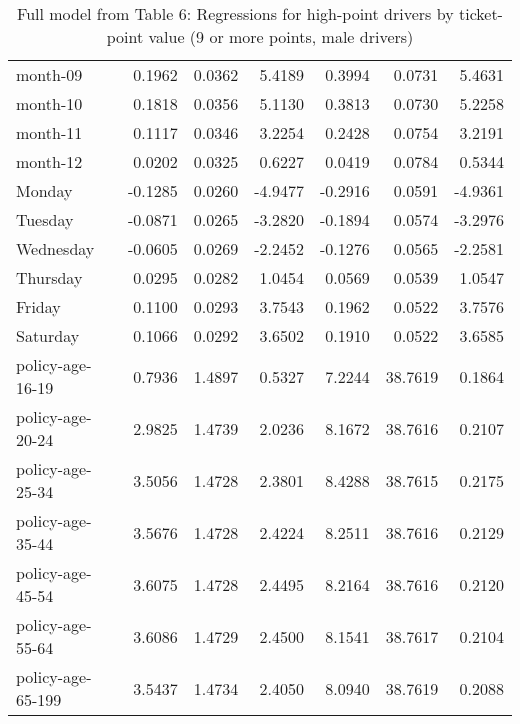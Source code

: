 \documentclass[10pt]{article}
\begin{document}
\begin{table}[ht]
\begin{tabular}{lrrrrrr}
  month-09 & 0.1962 & 0.0362 & 5.4189 & 0.3994 & 0.0731 & 5.4631 \\ 
  month-10 & 0.1818 & 0.0356 & 5.1130 & 0.3813 & 0.0730 & 5.2258 \\ 
  month-11 & 0.1117 & 0.0346 & 3.2254 & 0.2428 & 0.0754 & 3.2191 \\ 
  month-12 & 0.0202 & 0.0325 & 0.6227 & 0.0419 & 0.0784 & 0.5344 \\ 
  Monday & -0.1285 & 0.0260 & -4.9477 & -0.2916 & 0.0591 & -4.9361 \\ 
  Tuesday & -0.0871 & 0.0265 & -3.2820 & -0.1894 & 0.0574 & -3.2976 \\ 
  Wednesday & -0.0605 & 0.0269 & -2.2452 & -0.1276 & 0.0565 & -2.2581 \\ 
  Thursday & 0.0295 & 0.0282 & 1.0454 & 0.0569 & 0.0539 & 1.0547 \\ 
  Friday & 0.1100 & 0.0293 & 3.7543 & 0.1962 & 0.0522 & 3.7576 \\ 
  Saturday & 0.1066 & 0.0292 & 3.6502 & 0.1910 & 0.0522 & 3.6585 \\ 
  policy-age-16-19 & 0.7936 & 1.4897 & 0.5327 & 7.2244 & 38.7619 & 0.1864 \\ 
  policy-age-20-24 & 2.9825 & 1.4739 & 2.0236 & 8.1672 & 38.7616 & 0.2107 \\ 
  policy-age-25-34 & 3.5056 & 1.4728 & 2.3801 & 8.4288 & 38.7615 & 0.2175 \\ 
  policy-age-35-44 & 3.5676 & 1.4728 & 2.4224 & 8.2511 & 38.7616 & 0.2129 \\ 
  policy-age-45-54 & 3.6075 & 1.4728 & 2.4495 & 8.2164 & 38.7616 & 0.2120 \\ 
  policy-age-55-64 & 3.6086 & 1.4729 & 2.4500 & 8.1541 & 38.7617 & 0.2104 \\ 
  policy-age-65-199 & 3.5437 & 1.4734 & 2.4050 & 8.0940 & 38.7619 & 0.2088 \\ 
   \hline
\end{tabular}
\caption{Full model from Table 6: Regressions for high-point drivers by ticket-point value (9 or more points, male drivers)} 
\label{tab_6_9plus_pts_M}
\end{table}


\clearpage
\pagebreak



\end{document}
